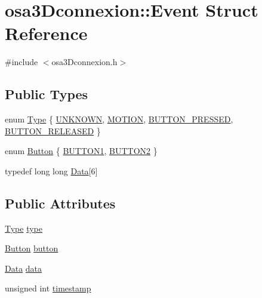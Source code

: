 \hypertarget{structosa3_dconnexion_1_1_event}{}\section{osa3\+Dconnexion\+:\+:Event Struct Reference}
\label{structosa3_dconnexion_1_1_event}


{\ttfamily \#include $<$osa3\+Dconnexion.\+h$>$}

\subsection*{Public Types}
\begin{DoxyCompactItemize}
\item 
enum \hyperlink{structosa3_dconnexion_1_1_event_aaa4e518fe0d3d3d37c21fa6badd76ce8}{Type} \{ \hyperlink{structosa3_dconnexion_1_1_event_aaa4e518fe0d3d3d37c21fa6badd76ce8aee40e3dd30b7da3c5949a3c14c0556a3}{U\+N\+K\+N\+O\+W\+N}, 
\hyperlink{structosa3_dconnexion_1_1_event_aaa4e518fe0d3d3d37c21fa6badd76ce8ab9e1d7ae1e96ef2b9831e16f8c85c648}{M\+O\+T\+I\+O\+N}, 
\hyperlink{structosa3_dconnexion_1_1_event_aaa4e518fe0d3d3d37c21fa6badd76ce8aee8b2fe042ad1f291bd397a09918e202}{B\+U\+T\+T\+O\+N\+\_\+\+P\+R\+E\+S\+S\+E\+D}, 
\hyperlink{structosa3_dconnexion_1_1_event_aaa4e518fe0d3d3d37c21fa6badd76ce8ab41e4f7dcab2710e78b090a470860574}{B\+U\+T\+T\+O\+N\+\_\+\+R\+E\+L\+E\+A\+S\+E\+D}
 \}
\item 
enum \hyperlink{structosa3_dconnexion_1_1_event_aec32735e02840e97c0502ba04759c0e2}{Button} \{ \hyperlink{structosa3_dconnexion_1_1_event_aec32735e02840e97c0502ba04759c0e2a0a2f6037b45dda9297d174180fcc805f}{B\+U\+T\+T\+O\+N1}, 
\hyperlink{structosa3_dconnexion_1_1_event_aec32735e02840e97c0502ba04759c0e2a311eda116d8ca2813d21e95b434ecc46}{B\+U\+T\+T\+O\+N2}
 \}
\item 
typedef long long \hyperlink{structosa3_dconnexion_1_1_event_a04c20e131cad7e8432b6fea40725c745}{Data}\mbox{[}6\mbox{]}
\end{DoxyCompactItemize}
\subsection*{Public Attributes}
\begin{DoxyCompactItemize}
\item 
\hyperlink{structosa3_dconnexion_1_1_event_aaa4e518fe0d3d3d37c21fa6badd76ce8}{Type} \hyperlink{structosa3_dconnexion_1_1_event_a5deeb96b286234ec1e97387494676d05}{type}
\item 
\hyperlink{structosa3_dconnexion_1_1_event_aec32735e02840e97c0502ba04759c0e2}{Button} \hyperlink{structosa3_dconnexion_1_1_event_a7cf9cc55aff27ec81a95735ae1906b0d}{button}
\item 
\hyperlink{structosa3_dconnexion_1_1_event_a04c20e131cad7e8432b6fea40725c745}{Data} \hyperlink{structosa3_dconnexion_1_1_event_a328ab06ff93f5426fd240fcd5a647449}{data}
\item 
unsigned int \hyperlink{structosa3_dconnexion_1_1_event_a2f0ccc260bb38dfe16957e33e5752a35}{timestamp}
\end{DoxyCompactItemize}


